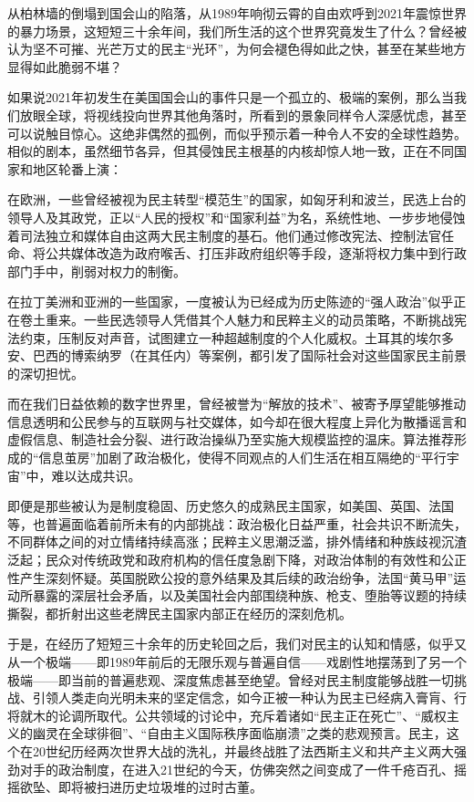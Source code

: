 \documentclass[UTF8, 10pt]{ctexbook}
\begin{document}
从柏林墙的倒塌到国会山的陷落，从1989年响彻云霄的自由欢呼到2021年震惊世界的暴力场景，这短短三十余年间，我们所生活的这个世界究竟发生了什么？曾经被认为坚不可摧、光芒万丈的民主“光环”，为何会褪色得如此之快，甚至在某些地方显得如此脆弱不堪？

如果说2021年初发生在美国国会山的事件只是一个孤立的、极端的案例，那么当我们放眼全球，将视线投向世界其他角落时，所看到的景象同样令人深感忧虑，甚至可以说触目惊心。这绝非偶然的孤例，而似乎预示着一种令人不安的全球性趋势。相似的剧本，虽然细节各异，但其侵蚀民主根基的内核却惊人地一致，正在不同国家和地区轮番上演：

在欧洲，一些曾经被视为民主转型“模范生”的国家，如匈牙利和波兰，民选上台的领导人及其政党，正以“人民的授权”和“国家利益”为名，系统性地、一步步地侵蚀着司法独立和媒体自由这两大民主制度的基石。他们通过修改宪法、控制法官任命、将公共媒体改造为政府喉舌、打压非政府组织等手段，逐渐将权力集中到行政部门手中，削弱对权力的制衡。

在拉丁美洲和亚洲的一些国家，一度被认为已经成为历史陈迹的“强人政治”似乎正在卷土重来。一些民选领导人凭借其个人魅力和民粹主义的动员策略，不断挑战宪法约束，压制反对声音，试图建立一种超越制度的个人化威权。土耳其的埃尔多安、巴西的博索纳罗（在其任内）等案例，都引发了国际社会对这些国家民主前景的深切担忧。

而在我们日益依赖的数字世界里，曾经被誉为“解放的技术”、被寄予厚望能够推动信息透明和公民参与的互联网与社交媒体，如今却在很大程度上异化为散播谣言和虚假信息、制造社会分裂、进行政治操纵乃至实施大规模监控的温床。算法推荐形成的“信息茧房”加剧了政治极化，使得不同观点的人们生活在相互隔绝的“平行宇宙”中，难以达成共识。

即便是那些被认为是制度稳固、历史悠久的成熟民主国家，如美国、英国、法国等，也普遍面临着前所未有的内部挑战：政治极化日益严重，社会共识不断流失，不同群体之间的对立情绪持续高涨；民粹主义思潮泛滥，排外情绪和种族歧视沉渣泛起；民众对传统政党和政府机构的信任度急剧下降，对政治体制的有效性和公正性产生深刻怀疑。英国脱欧公投的意外结果及其后续的政治纷争，法国“黄马甲”运动所暴露的深层社会矛盾，以及美国社会内部围绕种族、枪支、堕胎等议题的持续撕裂，都折射出这些老牌民主国家内部正在经历的深刻危机。

于是，在经历了短短三十余年的历史轮回之后，我们对民主的认知和情感，似乎又从一个极端——即1989年前后的无限乐观与普遍自信——戏剧性地摆荡到了另一个极端——即当前的普遍悲观、深度焦虑甚至绝望。曾经对民主制度能够战胜一切挑战、引领人类走向光明未来的坚定信念，如今正被一种认为民主已经病入膏肓、行将就木的论调所取代。公共领域的讨论中，充斥着诸如“民主正在死亡”、“威权主义的幽灵在全球徘徊”、“自由主义国际秩序面临崩溃”之类的悲观预言。民主，这个在20世纪历经两次世界大战的洗礼，并最终战胜了法西斯主义和共产主义两大强劲对手的政治制度，在进入21世纪的今天，仿佛突然之间变成了一件千疮百孔、摇摇欲坠、即将被扫进历史垃圾堆的过时古董。
\end{document}
